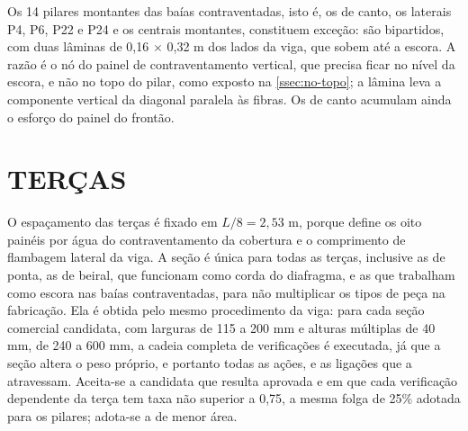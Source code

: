 Os 14 pilares montantes das baías contraventadas, isto é, os de canto, os
laterais P4, P6, P22 e P24 e os centrais montantes, constituem exceção: são
bipartidos, com duas lâminas de 0,16 $\times$ 0,32 m dos lados da viga, que
sobem até a escora. A razão é o nó do painel de contraventamento vertical, que
precisa ficar no nível da escora, e não no topo do pilar, como exposto na
\autoref{ssec:no-topo}; a lâmina leva a componente vertical da diagonal paralela
às fibras. Os de canto acumulam ainda o esforço do painel do frontão.

\section{TERÇAS}\label{sec:predim-tercas}

O espaçamento das terças é fixado em $L/8 = 2{,}53$ m, porque define os oito
painéis por água do contraventamento da cobertura e o comprimento de flambagem
lateral da viga. A seção é única para todas as terças, inclusive as de ponta,
as de beiral, que funcionam como corda do diafragma, e as que trabalham como
escora nas baías contraventadas, para não multiplicar os tipos de peça na
fabricação. Ela é obtida pelo mesmo procedimento da viga: para cada seção
comercial candidata, com larguras de 115 a 200 mm e alturas múltiplas de 40 mm,
de 240 a 600 mm, a cadeia completa de verificações é executada, já que a seção
altera o peso próprio, e portanto todas as ações, e as ligações que a
atravessam. Aceita-se a candidata que resulta aprovada e em que cada verificação
dependente da terça tem taxa não superior a 0,75, a mesma folga de 25\% adotada
para os pilares; adota-se a de menor área.


